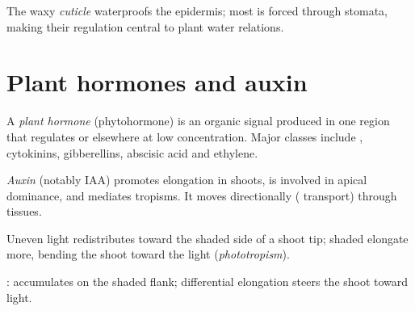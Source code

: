 \begin{remark}[Cuticle]\label{rem:g12:plant-biology:cuticle}
The waxy \emph{cuticle} waterproofs the epidermis; most
 is forced through stomata, making their regulation central
to plant water relations.
\end{remark}

\section{Plant hormones and auxin}

\begin{definition}\label{def:g12:plant-biology:hormone}
A \emph{plant hormone} (phytohormone) is an organic
signal produced in one region that regulates  or 
elsewhere at low concentration. Major classes include , cytokinins,
gibberellins, abscisic acid and ethylene.
\end{definition}

\begin{definition}[Auxin]\label{def:g12:plant-biology:auxin}
\emph{Auxin} (notably IAA) promotes  elongation in
shoots, is involved in apical dominance, and mediates tropisms. It moves
directionally ( transport) through tissues.
\end{definition}

\begin{proposition}[Phototropism]\label{prop:g12:plant-biology:photo}
Uneven light redistributes  toward the shaded side of a shoot tip;
shaded  elongate more, bending the shoot toward the light
(\emph{phototropism}).
\end{proposition}
\admitted

\begin{omfigure}

{\small {}:  accumulates on the shaded flank; differential
elongation steers the shoot toward light.}
\end{omfigure}

